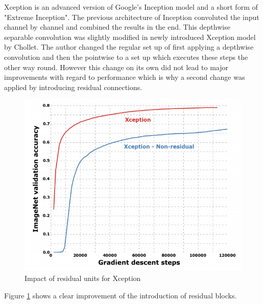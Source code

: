 Xception is an advanced version of Google's Inception model and a short form of "Extreme Inception". The previous architecture of Inception convoluted the input channel by channel and combined the results in the end. This depthwise separable convolution was slightly modified in newly introduced Xception model by Chollet\cite{chollet2017xception}. The author changed the regular set up of first applying a depthwise convolution and then the pointwise to a set up which executes these steps the other way round. However this change on its own did not lead to major improvements with regard to performance which is why a second change was applied by introducing residual connections\cite{chollet2017xception}.
\begin{figure}[ht]
  \centering
  \includegraphics[width=\linewidth]{figures/xception_residuals.png}
  \caption{Impact of residual units for Xception}
  \label{xception_residuals}
\end{figure}

Figure \ref{xception_residuals} shows a clear improvement of the introduction of residual blocks.

